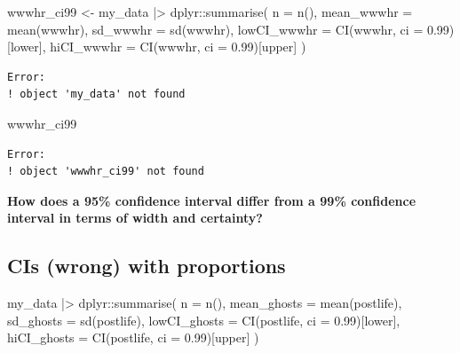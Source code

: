 \documentclass[
  letterpaper,
  DIV=11,
  numbers=noendperiod]{scrartcl}
\newenvironment{Shaded}{\begin{snugshade}}{\end{snugshade}}
\newcommand{\AttributeTok}[1]{\textcolor[rgb]{0.40,0.45,0.13}{#1}}
\newcommand{\FloatTok}[1]{\textcolor[rgb]{0.68,0.00,0.00}{#1}}
\newcommand{\FunctionTok}[1]{\textcolor[rgb]{0.28,0.35,0.67}{#1}}
\newcommand{\NormalTok}[1]{\textcolor[rgb]{0.00,0.23,0.31}{#1}}
\newcommand{\OtherTok}[1]{\textcolor[rgb]{0.00,0.23,0.31}{#1}}
\newcommand{\SpecialCharTok}[1]{\textcolor[rgb]{0.37,0.37,0.37}{#1}}
\newcommand{\StringTok}[1]{\textcolor[rgb]{0.13,0.47,0.30}{#1}}
\begin{document}
\begin{Shaded}
\begin{Highlighting}[]
\NormalTok{wwwhr\_ci99 }\OtherTok{\textless{}{-}}\NormalTok{ my\_data }\SpecialCharTok{|\textgreater{}}
\NormalTok{  dplyr}\SpecialCharTok{::}\FunctionTok{summarise}\NormalTok{(}
    \AttributeTok{n =} \FunctionTok{n}\NormalTok{(),}
    \AttributeTok{mean\_wwwhr =} \FunctionTok{mean}\NormalTok{(wwwhr),}
    \AttributeTok{sd\_wwwhr =} \FunctionTok{sd}\NormalTok{(wwwhr),}
    \AttributeTok{lowCI\_wwwhr =} \FunctionTok{CI}\NormalTok{(wwwhr, }\AttributeTok{ci =} \FloatTok{0.99}\NormalTok{)[}\StringTok{\textquotesingle{}lower\textquotesingle{}}\NormalTok{],}
    \AttributeTok{hiCI\_wwwhr  =} \FunctionTok{CI}\NormalTok{(wwwhr, }\AttributeTok{ci =} \FloatTok{0.99}\NormalTok{)[}\StringTok{\textquotesingle{}upper\textquotesingle{}}\NormalTok{]}
\NormalTok{    )}
\end{Highlighting}
\end{Shaded}

\begin{verbatim}
Error:
! object 'my_data' not found
\end{verbatim}

\begin{Shaded}
\begin{Highlighting}[]
\NormalTok{wwwhr\_ci99}
\end{Highlighting}
\end{Shaded}

\begin{verbatim}
Error:
! object 'wwwhr_ci99' not found
\end{verbatim}

 \textbf{How does a 95\% confidence interval differ
from a 99\% confidence interval in terms of width and certainty?}

\subsection{CIs (wrong) with
proportions}\label{cis-wrong-with-proportions}

\begin{Shaded}
\begin{Highlighting}[]
\NormalTok{my\_data }\SpecialCharTok{|\textgreater{}}
\NormalTok{  dplyr}\SpecialCharTok{::}\FunctionTok{summarise}\NormalTok{(}
    \AttributeTok{n =} \FunctionTok{n}\NormalTok{(),}
    \AttributeTok{mean\_ghosts =} \FunctionTok{mean}\NormalTok{(postlife),}
    \AttributeTok{sd\_ghosts =} \FunctionTok{sd}\NormalTok{(postlife),}
    \AttributeTok{lowCI\_ghosts =} \FunctionTok{CI}\NormalTok{(postlife, }\AttributeTok{ci =} \FloatTok{0.99}\NormalTok{)[}\StringTok{\textquotesingle{}lower\textquotesingle{}}\NormalTok{],}
    \AttributeTok{hiCI\_ghosts  =} \FunctionTok{CI}\NormalTok{(postlife, }\AttributeTok{ci =} \FloatTok{0.99}\NormalTok{)[}\StringTok{\textquotesingle{}upper\textquotesingle{}}\NormalTok{]}
\NormalTok{    )}
\end{Highlighting}
\end{Shaded}
\end{document}
